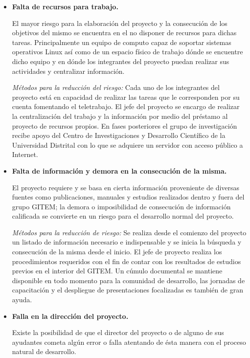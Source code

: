 \begin{itemize}
\item \textbf{Falta de recursos para trabajo.} 

El mayor riesgo para la elaboración del proyecto y la consecución de los objetivos del mismo se encuentra en el no disponer de recursos para dichas tareas. Principalmente un equipo de computo capaz de soportar sistemas operativos Linux así como de  un espacio físico de trabajo dónde se encuentre dicho equipo y en dónde los integrantes del proyecto puedan realizar sus actividades y centralizar información.

\textit{Métodos para la reducción del riesgo:}  Cada uno de los integrantes del proyecto está en capacidad de realizar las tareas que le corresponden por su cuenta fomentando el teletrabajo. El jefe del proyecto se encargo de realizar la centralización del trabajo y la información por medio del préstamo al proyecto de recursos propios. En fases posteriores el grupo de investigación recibe apoyo del Centro de Investigaciones y Desarrollo Científico de la Universidad Distrital con lo que se adquiere un servidor con acceso público a Internet.



\item \textbf{Falta de información y demora en la consecución de la misma.}

El proyecto requiere y se basa en cierta información proveniente de diversas fuentes como publicaciones, manuales y estudios realizados dentro y fuera del grupo GITEM; la demora o imposibilidad de consecución de información calificada se convierte en un riesgo para el desarrollo normal del proyecto.

\textit{Métodos para la reducción de riesgo:} Se realiza desde el comienzo del proyecto un listado de información necesario e indispensable y se inicia la búsqueda y consecución de la misma desde el inicio.  El jefe de proyecto realiza los procedimientos requeridos con el fin de contar con los resultados de estudios previos en el interior del GITEM. Un cúmulo documental se mantiene disponible en todo momento para la comunidad de desarrollo, las jornadas de capacitación y el despliegue de presentaciones focalizadas es también de gran ayuda.

\item \textbf{Falla en la dirección del proyecto.}

Existe la posibilidad de que el director del proyecto o de alguno de sus ayudantes cometa algún error o falla atentando de ésta manera con el proceso natural de desarrollo.


\end{itemize}
